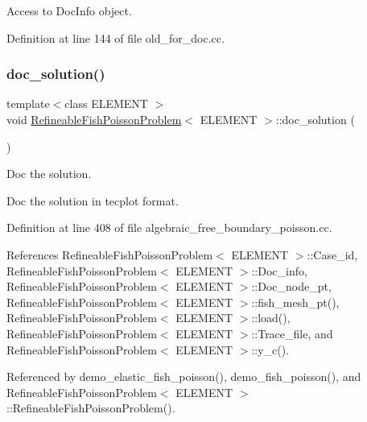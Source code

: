Access to Doc\+Info object. 



Definition at line 144 of file old\+\_\+for\+\_\+doc.\+cc.

\mbox{\label{classRefineableFishPoissonProblem_a6db25ff0bd3014aa531d9f0e8b385beb}} 
\subsubsection{\texorpdfstring{doc\+\_\+solution()}{doc\_solution()}\hspace{0.1cm}{\footnotesize\ttfamily [1/2]}}
{\footnotesize\ttfamily template$<$class E\+L\+E\+M\+E\+NT $>$ \\
void \hyperlink{classRefineableFishPoissonProblem}{Refineable\+Fish\+Poisson\+Problem}$<$ E\+L\+E\+M\+E\+NT $>$\+::doc\+\_\+solution (\begin{DoxyParamCaption}{ }\end{DoxyParamCaption})}



Doc the solution. 

Doc the solution in tecplot format. 

Definition at line 408 of file algebraic\+\_\+free\+\_\+boundary\+\_\+poisson.\+cc.



References Refineable\+Fish\+Poisson\+Problem$<$ E\+L\+E\+M\+E\+N\+T $>$\+::\+Case\+\_\+id, Refineable\+Fish\+Poisson\+Problem$<$ E\+L\+E\+M\+E\+N\+T $>$\+::\+Doc\+\_\+info, Refineable\+Fish\+Poisson\+Problem$<$ E\+L\+E\+M\+E\+N\+T $>$\+::\+Doc\+\_\+node\+\_\+pt, Refineable\+Fish\+Poisson\+Problem$<$ E\+L\+E\+M\+E\+N\+T $>$\+::fish\+\_\+mesh\+\_\+pt(), Refineable\+Fish\+Poisson\+Problem$<$ E\+L\+E\+M\+E\+N\+T $>$\+::load(), Refineable\+Fish\+Poisson\+Problem$<$ E\+L\+E\+M\+E\+N\+T $>$\+::\+Trace\+\_\+file, and Refineable\+Fish\+Poisson\+Problem$<$ E\+L\+E\+M\+E\+N\+T $>$\+::y\+\_\+c().



Referenced by demo\+\_\+elastic\+\_\+fish\+\_\+poisson(), demo\+\_\+fish\+\_\+poisson(), and Refineable\+Fish\+Poisson\+Problem$<$ E\+L\+E\+M\+E\+N\+T $>$\+::\+Refineable\+Fish\+Poisson\+Problem().

